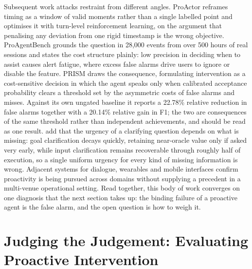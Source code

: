 Subsequent work attacks restraint from different angles. ProActor
\citep[an unrefereed conference submission]{ding_proactor_2026} reframes timing
as a window of valid moments rather than a single labelled point and optimises
it with turn-level reinforcement learning, on the argument that penalising any
deviation from one rigid timestamp is the wrong objective. ProAgentBench
\citep[a 2026 preprint]{tang_proagentbench_2026} grounds the question in 28,000
events from over 500 hours of real sessions and states the cost structure
plainly: low precision in deciding when to assist causes alert fatigue, where
excess false alarms drive users to ignore or disable the feature. PRISM
\citep[a 2026 preprint]{fu_prism_2026} draws the consequence, formulating
intervention as a cost-sensitive decision in which the agent speaks only when
calibrated acceptance probability clears a threshold set by the asymmetric
costs of false alarms and misses. Against its own ungated baseline it reports a
22.78\% relative reduction in false alarms together with a 20.14\% relative
gain in F1; the two are consequences of the same threshold rather than
independent achievements, and should be read as one result.
\citet[a 2026 preprint]{gulati_ask_2026} add that the urgency of a clarifying
question depends on what is missing: goal clarification decays quickly,
retaining near-oracle value only if asked very early, while input clarification
remains recoverable through roughly half of execution, so a single uniform
urgency for every kind of missing information is wrong. Adjacent systems for
dialogue, wearables and mobile interfaces
\citep{liu_proactiveeval_2025,yang_contextagent_2025,yang_fingertip_2025}
confirm proactivity is being pursued across domains without supplying a
precedent in a multi-venue operational setting. Read together, this body of
work converges on one diagnosis that the next section takes up: the binding
failure of a proactive agent is the false alarm, and the open question is how
to weigh it.

\section{Judging the Judgement: Evaluating Proactive Intervention}
\label{sec:rw-evaluation}

